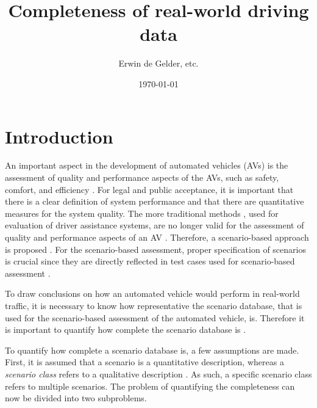 \documentclass[10pt,final,a4paper,oneside,onecolumn]{article}
\def\reptitle{Completeness of real-world driving data}
\def\repauthor{Erwin de Gelder, etc.}
\theoremstyle{plain}\newtheorem{definition}{Definition}[section]    %
\theoremstyle{definition}\newtheorem{example}{Example}[section]     %
\theoremstyle{remark}\newtheorem{remarkenv}{Remark}[section]        %
\begin{document}

\title{\textbf{\reptitle}}
\author{\repauthor}
\date{\today}
\maketitle

\tableofcontents

\newpage

\section{Introduction}
\label{sec:introduction}

An important aspect in the development of automated vehicles (AVs) is the assessment of quality and performance aspects of the AVs, such as safety, comfort, and efficiency \cite{bengler2014threedecades, stellet2015taxonomy, wachenfeld2016release, putz2017pegasus, roesener2016scenariobased, kompass2015sicherheitsveranderung}. 
For legal and public acceptance, it is important that there is a clear definition of system performance and that there are quantitative measures for the system quality. 
The more traditional methods \cite{response2006code, ISO26262}, used for evaluation of driver assistance systems, are no longer valid for the assessment of quality and performance aspects of an AV \cite{wachenfeld2016release}. 
Therefore, a scenario-based approach is proposed \cite{roesener2016scenariobased, putz2017pegasus, kompass2015sicherheitsveranderung}. 
For the scenario-based assessment, proper specification of scenarios is crucial since they are directly reflected in test cases used for scenario-based assessment \cite{stellet2015taxonomy}.

To draw conclusions on how an automated vehicle would perform in real-world traffic, it is necessary to know how representative the scenario database, that is used for the scenario-based assessment of the automated vehicle, is. Therefore it is important to quantify how complete the scenario database is \cite{geyer2014, alvarez2017prospective, stellet2015taxonomy}.

\cbstart
To quantify how complete a scenario database is, a few assumptions are made. First, it is assumed that a scenario is a quantitative description, whereas a \emph{scenario class} refers to a qualitative description \cite{degelder2018ontology}. As such, a specific scenario class refers to multiple scenarios. The problem of quantifying the completeness can now be divided into two subproblems.
\end{document}
